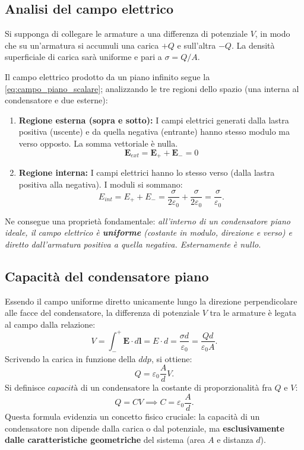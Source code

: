 \documentclass[a4paper,11pt]{report}
\begin{document}
\subsection{Analisi del campo elettrico}
Si supponga di collegare le armature a una differenza di potenziale $V$, in modo che su un'armatura si accumuli una carica $+Q$ e sull'altra $-Q$. La densità superficiale di carica sarà uniforme e pari a $\sigma = Q/A$.

Il campo elettrico prodotto da un piano infinito segue la \eqref{eq:campo_piano_scalare}; analizzando le tre regioni dello spazio (una interna al condensatore e due esterne):

\begin{enumerate}
    \item \textbf{Regione esterna (sopra e sotto):} I campi elettrici generati dalla lastra positiva (uscente) e da quella negativa (entrante) hanno stesso modulo ma verso opposto. La somma vettoriale è nulla.
    \[ \bm{E}_{ext} = \bm{E}_+ + \bm{E}_- = 0 \]
    \item \textbf{Regione interna:} I campi elettrici hanno lo stesso verso (dalla lastra positiva alla negativa). I moduli si sommano:
    \[ E_{int} = E_+ + E_- = \frac{\sigma}{2\varepsilon_0} + \frac{\sigma}{2\varepsilon_0} = \frac{\sigma}{\varepsilon_0}. \]
\end{enumerate}

Ne consegue una proprietà fondamentale: \textit{all'interno di un condensatore piano ideale, il campo elettrico è \textbf{uniforme} (costante in modulo, direzione e verso) e diretto dall'armatura positiva a quella negativa. Esternamente è nullo.}

\subsection{Capacità del condensatore piano}
Essendo il campo uniforme diretto unicamente lungo la direzione perpendicolare alle facce del condensatore, la differenza di potenziale $V$ tra le armature è legata al campo dalla relazione:
\begin{equation}
    V = \int_-^+ \bm{E} \cdot d\bm{l} = E \cdot d = \frac{\sigma d}{\varepsilon_0} = \frac{Q d}{\varepsilon_0 A}.
\end{equation}
Scrivendo la carica in funzione della $ddp$, si ottiene:
\begin{equation}
    Q = \varepsilon_0\frac{A}{d}V.
\end{equation}
Si definisce $capacità$ di un condensatore la costante di proporzionalità fra $Q$ e $V$:
\begin{equation}
   Q = CV \implies  C = \varepsilon_0\frac{A}{d}.
\end{equation}
Questa formula evidenzia un concetto fisico cruciale: la capacità di un condensatore non dipende dalla carica o dal potenziale, ma \textbf{esclusivamente dalle caratteristiche geometriche} del sistema (area $A$ e distanza $d$).
\end{document}
